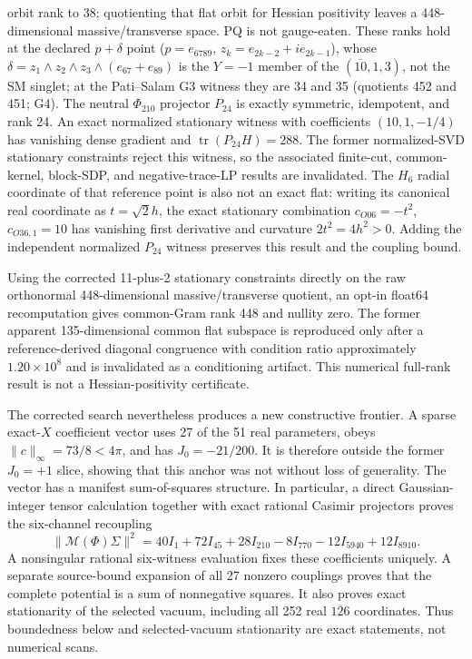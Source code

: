 \documentclass[11pt,a4paper]{article}
\begin{document}
orbit rank to 38; quotienting that flat orbit for Hessian positivity leaves a
448-dimensional massive/transverse space. PQ is not gauge-eaten. These ranks
hold at the declared $p+\delta$ point ($p=e_{6789}$, $z_k=e_{2k-2}+ie_{2k-1}$),
whose $\delta=z_1\wedge z_2\wedge z_3\wedge(e_{67}+e_{89})$ is the $Y=-1$ member of
the $(\overline{10},1,3)$, not the SM singlet; at the Pati--Salam G3 witness
they are 34 and 35 (quotients 452 and 451; G4). The neutral
$\Phi_{210}$
projector $P_{24}$ is exactly symmetric, idempotent, and rank 24. An exact
normalized stationary witness with coefficients $(10,1,-1/4)$ has vanishing
dense gradient and $\operatorname{tr}(P_{24}H)=288$. The former normalized-SVD
stationary constraints reject this witness, so the associated finite-cut,
common-kernel, block-SDP, and negative-trace-LP results are invalidated. The
$H_6$ radial coordinate of that reference point is also not an exact flat: writing its
canonical real coordinate as $t=\sqrt2 h$, the exact stationary combination
$c_{O06}=-t^2$, $c_{O36,1}=10$ has vanishing first derivative and curvature
$2t^2=4h^2>0$. Adding the independent normalized $P_{24}$ witness preserves
this result and the coupling bound.

Using the corrected 11-plus-2 stationary constraints directly on the raw
orthonormal 448-dimensional massive/transverse quotient, an opt-in float64
recomputation gives common-Gram rank 448 and nullity zero. The former apparent
135-dimensional common flat subspace is reproduced only after a
reference-derived diagonal congruence with condition ratio approximately
$1.20\times10^8$ and is invalidated as a conditioning artifact. This numerical
full-rank result is not a Hessian-positivity certificate.

The corrected search nevertheless produces a new constructive frontier. A
sparse exact-$X$ coefficient vector uses 27 of the 51 real parameters, obeys
$\lVert c\rVert_\infty=73/8<4\pi$, and has $J_0=-21/200$. It is therefore
outside the former $J_0=+1$ slice, showing that this anchor was not without
loss of generality. The vector has a manifest sum-of-squares structure. In
particular, a direct Gaussian-integer tensor calculation together with exact
rational Casimir projectors proves the six-channel recoupling
\begin{equation}
 \lVert \mathcal M(\Phi)\Sigma\rVert^2 =
 40 I_1+72 I_{45}+28 I_{210}-8 I_{770}-12 I_{5940}+12 I_{8910}.
\end{equation}
A nonsingular rational six-witness evaluation fixes these coefficients
uniquely. A separate source-bound expansion of all 27 nonzero couplings proves
that the complete potential is a sum of nonnegative squares. It also proves
exact stationarity of the selected vacuum, including all 252 real
$\overline{126}$ coordinates. Thus boundedness below and selected-vacuum
stationarity are exact statements, not numerical scans.
\end{document}
